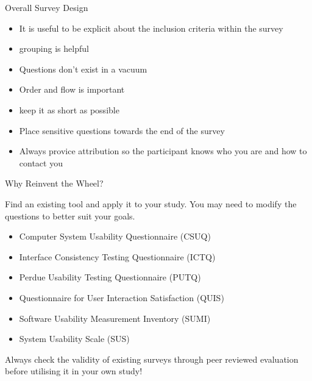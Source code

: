 \begin{frame}{Overall Survey Design}

\begin{itemize}
\tightlist
\item
  It is useful to be explicit about the inclusion criteria within the
  survey
\item
  grouping is helpful
\item
  Questions don't exist in a vacuum
\item
  Order and flow is important
\item
  keep it as short as possible
\item
  Place sensitive questions towards the end of the survey
\item
  Always provice attribution so the participant knows who you are and
  how to contact you
\end{itemize}

\end{frame}

\begin{frame}{Why Reinvent the Wheel?}

Find an existing tool and apply it to your study. You may need to modify
the questions to better suit your goals.

\begin{itemize}
\tightlist
\item
  Computer System Usability Questionnaire (CSUQ)
\item
  Interface Consistency Testing Questionnaire (ICTQ)
\item
  Perdue Usability Testing Questionnaire (PUTQ)
\item
  Questionnaire for User Interaction Satisfaction (QUIS)
\item
  Software Usability Measurement Inventory (SUMI)
\item
  System Usability Scale (SUS)
\end{itemize}

Always check the validity of existing surveys through peer reviewed
evaluation before utilising it in your own study!

\end{frame}




